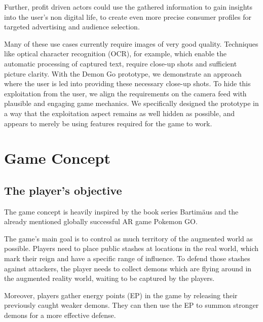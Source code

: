 Further, profit driven actors could use the gathered information to gain insights into the user's non digital life, to create even more precise consumer profiles for targeted advertising and audience selection.

Many of these use cases currently require images of very good quality.
Techniques like optical character recognition (OCR), for example, which enable the automatic processing of captured text, require close-up shots and sufficient picture clarity.
With the Demon Go prototype, we demonstrate an approach where the user is led into providing these necessary close-up shots.
To hide this exploitation from the user, we align the requirements on the camera feed with plausible and engaging game mechanics.
We specifically designed the prototype in a way that the exploitation aspect remains as well hidden as possible, and appears to merely be using features required for the game to work.

\section{Game Concept}
\label{sec:concept}


\subsection{The player's objective}
The game concept is heavily inspired by the book series Bartimäus and the already mentioned globally successful AR game Pokemon GO.

The game's main goal is to control as much territory of the augmented world as possible.
Players need to place public stashes at locations in the real world, which mark their reign and have a specific range of influence. 
To defend those stashes against attackers, the player needs to collect demons which are flying around in the augmented reality world, waiting to be captured by the players. 

Moreover, players gather energy points (EP) in the game by releasing their previously caught weaker demons. They can then use the EP to summon stronger demons for a more effective defense.

